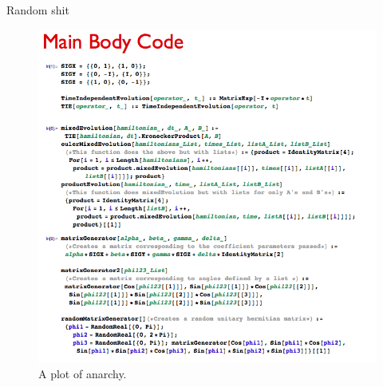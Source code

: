 \documentclass[14pt]{beamer}
\renewcommand{\maketitle}{%
	\begin{center}%
		\Huge\inserttitle\\[5mm]%
		\Large\insertauthor\\[5mm]%
		\Large\insertinstitute%
	\end{center}%
	\vspace*{-1.5ex}%
}
\begin{document}
\begin{frame}{\maketitle}
\begin{columns}
\begin{column}{.45\textwidth}
\begin{block}{Random shit}
\begin{figure}[htpb]
		\centering
			\includegraphics[scale=1.1]{code.png}
		\centering
		\caption{A plot of anarchy.}
		\label{fig:anarch_plot}
	\end{figure}


\end{block}
							\end{column}
	
		\end{columns}
	\end{frame}
\end{document}
